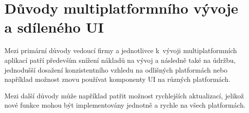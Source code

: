 \section{Důvody multiplatformního vývoje a sdíleného UI}

Mezi primární důvody vedoucí firmy a jednotlivce k~vývoji multiplatformních aplikací patří především
snížení nákladů na vývoj a následně také na údržbu, jednodušší dosažení konzistentního vzhledu
na odlišných platformách nebo například možnost znovu používat komponenty UI na různých platformách.

Mezi další důvody může například patřit možnost rychlejších aktualizací, jelikož nové funkce mohou být 
implementovány jednotně a rychle na všech platformách. 
